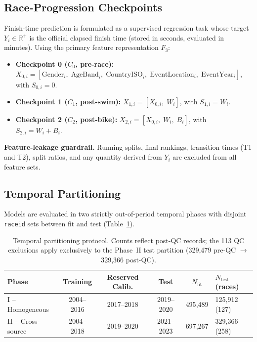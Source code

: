\documentclass[11pt,a4paper]{article}
\begin{document}
\subsection{Race-Progression Checkpoints}

Finish-time prediction is formulated as a supervised regression task
whose target $Y_i \in \mathbb{R}^{+}$ is the official elapsed finish
time (stored in seconds, evaluated in minutes). Using the primary
feature representation $F_3$:

\begin{itemize}[leftmargin=*]
  \item \textbf{Checkpoint 0 ($C_0$, pre-race):}
  $X_{0,i} = [\text{Gender}_i,\; \text{AgeBand}_i,\;
  \text{CountryISO}_i,\; \text{EventLocation}_i,\;
  \text{EventYear}_i]$, with $S_{0,i} = 0$.

  \item \textbf{Checkpoint 1 ($C_1$, post-swim):}
  $X_{1,i} = [X_{0,i},\; W_i]$, with $S_{1,i} = W_i$.

  \item \textbf{Checkpoint 2 ($C_2$, post-bike):}
  $X_{2,i} = [X_{0,i},\; W_i,\; B_i]$, with $S_{2,i} = W_i + B_i$.
\end{itemize}

\noindent\textbf{Feature-leakage guardrail.} Running splits, final
rankings, transition times (T1 and T2), split ratios, and any
quantity derived from $Y_i$ are excluded from all feature sets.

\subsection{Temporal Partitioning}
\label{sec:temporal}

Models are evaluated in two strictly out-of-period temporal phases
with disjoint \texttt{raceid} sets between fit and test
(Table~\ref{tab:temporal_split}).

\begin{table}[htbp]
\centering
\small
\caption{Temporal partitioning protocol. Counts reflect post-QC
records; the 113 QC exclusions apply exclusively to the Phase~II test
partition (329{,}479 pre-QC $\rightarrow$ 329{,}366 post-QC).}
\label{tab:temporal_split}
\renewcommand{\arraystretch}{1.2}
\begin{tabularx}{\textwidth}{lcccc X}
\toprule
\textbf{Phase} & \textbf{Training} & \textbf{Reserved Calib.}
  & \textbf{Test} & $N_{\text{fit}}$ & $N_{\text{test}}$ (races) \\
\midrule
I -- Homogeneous & 2004--2016 & 2017--2018 & 2019--2020
  & 495{,}489 & 125{,}912 (127) \\
II -- Cross-source & 2004--2018 & 2019--2020 & 2021--2023
  & 697{,}267 & 329{,}366 (258) \\
\bottomrule
\end{tabularx}
\end{table}
\end{document}
